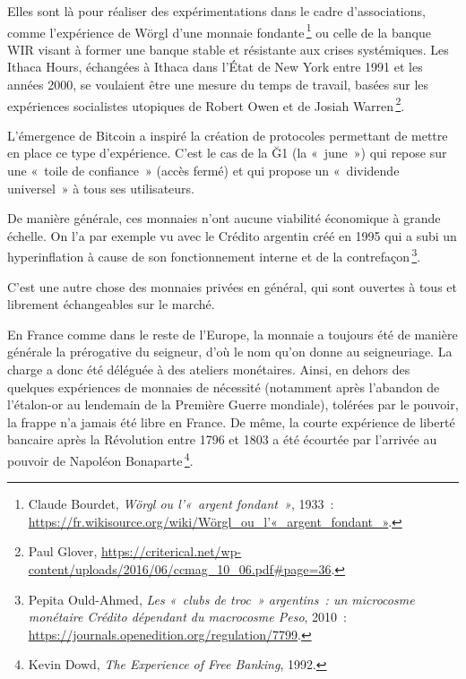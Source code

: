 \documentclass[a4paper,notitlepage]{article}
\newcommand{\eng}[1]{{\NoAutoSpaceBeforeFDP\emph{#1}}}  %
\newcommand{\sfootnote}{\,\footnote}
\begin{document}
Elles sont là pour réaliser des expérimentations dans le cadre d'associations, comme l'expérience de Wörgl d'une monnaie fondante\sfootnote{Claude Bourdet, \emph{Wörgl ou l'«~argent fondant~»}, 1933~: \url{https://fr.wikisource.org/wiki/Wörgl_ou_l’«_argent_fondant_»}.} ou celle de la banque WIR visant à former une banque stable et résistante aux crises systémiques. Les Ithaca Hours, échangées à Ithaca dans l'État de New York entre 1991 et les années 2000, se voulaient être une mesure du temps de travail, basées sur les expériences socialistes utopiques de Robert Owen et de Josiah Warren\sfootnote{Paul Glover, \url{https://criterical.net/wp-content/uploads/2016/06/ccmag_10_06.pdf\#page=36}.}.

L'émergence de Bitcoin a inspiré la création de protocoles permettant de mettre en place ce type d'expérience. C'est le cas de la Ğ1 (la «~june~») qui repose sur une «~toile de confiance~» (accès fermé) et qui propose un «~dividende universel~» à tous ses utilisateurs. %

De manière générale, ces monnaies n'ont aucune viabilité économique à grande échelle. On l'a par exemple vu avec le Crédito argentin créé en 1995 qui a subi un hyperinflation à cause de son fonctionnement interne et de la contrefaçon\sfootnote{Pepita Ould-Ahmed, \emph{Les «~clubs de troc~» argentins~: un microcosme monétaire Crédito dépendant du macrocosme Peso}, 2010~: \url{https://journals.openedition.org/regulation/7799}.}.


C'est une autre chose des monnaies privées en général, qui sont ouvertes à tous et librement échangeables sur le marché.

En France comme dans le reste de l'Europe, la monnaie a toujours été de manière générale la prérogative du seigneur, d'où le nom qu'on donne au seigneuriage. La charge a donc été déléguée à des ateliers monétaires. Ainsi, en dehors des quelques expériences de monnaies de nécessité (notamment après l'abandon de l'étalon-or au lendemain de la Première Guerre mondiale), tolérées par le pouvoir, la frappe n'a jamais été libre en France. De même, la courte expérience de liberté bancaire après la Révolution entre 1796 et 1803 a été écourtée par l'arrivée au pouvoir de Napoléon Bonaparte\sfootnote{Kevin Dowd, \eng{The Experience of Free Banking}, 1992.}.
\end{document}
